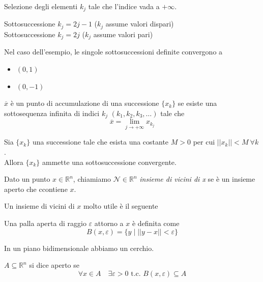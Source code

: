 \begin{defn}[Sottosuccessione]
 Selezione degli elementi $k_j$ tale che l'indice vada a $+\infty$.
\end{defn}
\begin{example}
Sottosuccessione $k_j = 2j-1$ ($k_j$ assume valori dispari)\\
Sottosuccessione $k_j = 2j$ ($k_j$ assume valori pari)
\end{example}
Nel caso dell'esempio, le singole sottosuccessioni definite convergono a
\begin{itemize}
 \item $(0,1)$
 \item $(0,-1)$
\end{itemize}
\begin{defn}
$\overline{x}$ è un punto di accumulazione di una successione
 $\{x_k\}$  se esiste una sottosequenza infinita di indici $k_j$ $ (k_1,k_2,
k_3, \ldots )$ tale che
$$\overline{x} =   \lim_{j \to +\infty}x_{k_{j}}$$

\end{defn}

\begin{theo}
 Sia $\{x_k\}$ una successione tale che  esista una costante $M>0$ 
per cui $||x_k|| < M ~ \forall k$.\\
Allora $\{x_k\}$ ammette una sottosuccessione convergente.
\end{theo}

\begin{defn}
 Dato un punto $x \in \mathbb{R}^{n}$, chiamiamo
$\mathcal{N} \in \mathbb{R}^{n}$  \emph{insieme di vicini di x} se
è un insieme aperto che ccontiene $x$.
\end{defn}
Un insieme di vicini di $x$ molto utile è il seguente

\begin{defn}
Una palla aperta di raggio $\varepsilon$ attorno a $x$ \`e
definita come
$$ B(x,\varepsilon) = \{ y \; | \; ||y-x|| < \varepsilon \}$$
\end{defn}
In un piano bidimensionale abbiamo un cerchio.


\begin{defn}
 $A \subseteq \mathbb{R}^{n}$ si dice aperto se
$$\forall x \in A \quad \exists \varepsilon > 0 
   \text { t.c. }
 B(x, \varepsilon) \subseteq A
$$
\end{defn}

